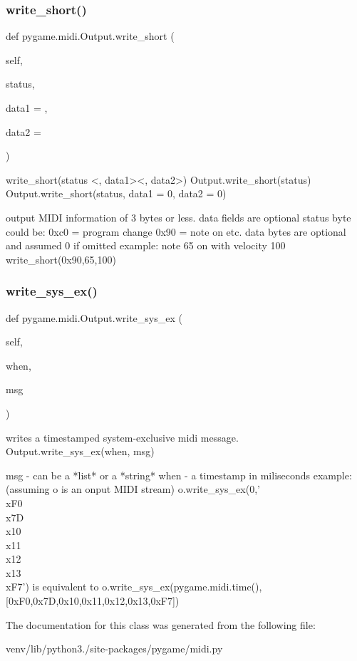 \subsubsection{\texorpdfstring{write\+\_\+short()}{write\_short()}}
{\footnotesize\ttfamily def pygame.\+midi.\+Output.\+write\+\_\+short (\begin{DoxyParamCaption}\item[{}]{self,  }\item[{}]{status,  }\item[{}]{data1 = {},  }\item[{}]{data2 = {} }\end{DoxyParamCaption})}

\begin{DoxyVerb}write_short(status <, data1><, data2>)
Output.write_short(status)
Output.write_short(status, data1 = 0, data2 = 0)

output MIDI information of 3 bytes or less.
data fields are optional
status byte could be:
     0xc0 = program change
     0x90 = note on
     etc.
     data bytes are optional and assumed 0 if omitted
example: note 65 on with velocity 100
     write_short(0x90,65,100)
\end{DoxyVerb}
 \mbox{\label{classpygame_1_1midi_1_1_output_a5a557c0076a59d906da5cfd99ccfb109}} 
\subsubsection{\texorpdfstring{write\+\_\+sys\+\_\+ex()}{write\_sys\_ex()}}
{\footnotesize\ttfamily def pygame.\+midi.\+Output.\+write\+\_\+sys\+\_\+ex (\begin{DoxyParamCaption}\item[{}]{self,  }\item[{}]{when,  }\item[{}]{msg }\end{DoxyParamCaption})}

\begin{DoxyVerb}writes a timestamped system-exclusive midi message.
Output.write_sys_ex(when, msg)

msg - can be a *list* or a *string*
when - a timestamp in miliseconds
example:
  (assuming o is an onput MIDI stream)
    o.write_sys_ex(0,'\\xF0\\x7D\\x10\\x11\\x12\\x13\\xF7')
  is equivalent to
    o.write_sys_ex(pygame.midi.time(),
           [0xF0,0x7D,0x10,0x11,0x12,0x13,0xF7])
\end{DoxyVerb}
 

The documentation for this class was generated from the following file\+:\begin{DoxyCompactItemize}
\item 
venv/lib/python3./site-\/packages/pygame/midi.\+py\end{DoxyCompactItemize}
